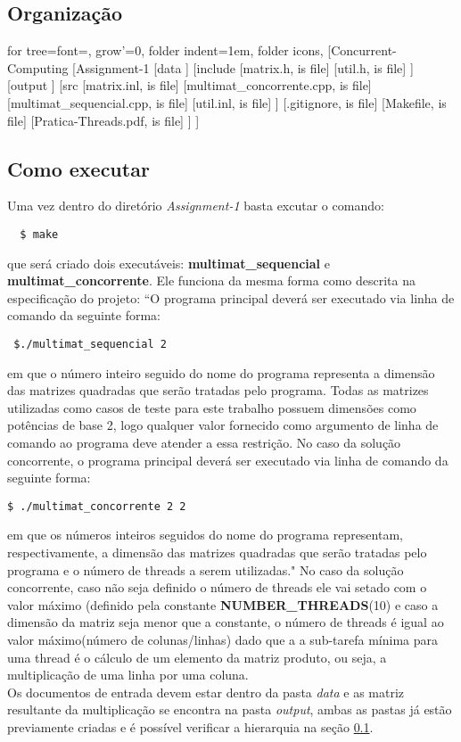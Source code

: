 \subsection{Organização}\label{ssec:org}
for tree={font=\sffamily, grow'=0,
	folder indent=1em, folder icons,
}
[Concurrent-Computing
	[Assignment-1
		[data
		]
		[include
			[matrix.h, is file]
			[util.h, is file]
		]
		[output
		]
		[src
			[matrix.inl, is file]
			[multimat\_concorrente.cpp, is file]
			[multimat\_sequencial.cpp, is file]
			[util.inl, is file]
		]
		[.gitignore, is file]
		[Makefile, is file]
		[Pratica-Threads.pdf, is file]
	]
]
\subsection{Como executar}
Uma vez dentro do diretório \textit{Assignment-1} basta excutar o comando:
\begin{verbatim}
  $ make
\end{verbatim}
que será criado dois executáveis:
\textbf{multimat\_sequencial} e \textbf{multimat\_concorrente}.
Ele funciona da mesma forma como descrita na especificação do projeto:
``O programa principal deverá ser executado via linha de comando da seguinte forma:
\begin{verbatim}
 $./multimat_sequencial 2
\end{verbatim}
em que o número inteiro seguido do nome do programa representa a dimensão das matrizes quadradas que serão tratadas pelo programa. Todas as matrizes utilizadas como casos de teste para este trabalho possuem dimensões como potências de base 2, logo qualquer valor fornecido como argumento de linha de comando ao programa deve atender a essa restrição. No caso da solução concorrente, o programa principal deverá ser executado via linha de comando da seguinte forma:
\begin{verbatim}
$ ./multimat_concorrente 2 2
\end{verbatim}
em que os números inteiros seguidos do nome do programa representam, respectivamente, a dimensão
das matrizes quadradas que serão tratadas pelo programa e o número de threads a serem
utilizadas." No caso da solução concorrente, caso não seja definido o número de threads ele vai setado com o valor máximo (definido pela constante \textbf{NUMBER\_THREADS}(10) e caso a dimensão da matriz seja menor que a constante, o número de threads é igual ao valor máximo(número de colunas/linhas) dado que a a sub-tarefa mínima para uma thread é o cálculo de um elemento da matriz produto, ou seja, a multiplicação de uma linha por uma coluna.\\
Os documentos de entrada devem estar dentro da pasta \textit{data} e as matriz resultante da multiplicação se encontra na pasta \textit{output}, ambas as pastas já estão previamente criadas e é possível verificar a hierarquia na seção \ref{ssec:org}.\\
